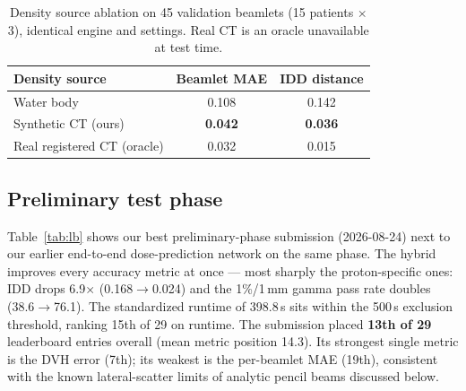 \documentclass[runningheads]{llncs}
\begin{document}
\begin{table}[t]
\centering
\caption{Density source ablation on 45 validation beamlets (15 patients $\times$ 3), identical engine and settings. Real CT is an oracle unavailable at test time.}
\label{tab:density}
\begin{tabular}{lcc}
\toprule
Density source & Beamlet MAE & IDD distance\\
\midrule
Water body & 0.108 & 0.142\\
Synthetic CT (ours) & \textbf{0.042} & \textbf{0.036}\\
Real registered CT (oracle) & 0.032 & 0.015\\
\bottomrule
\end{tabular}
\end{table}

\subsection{Preliminary test phase}
Table~\ref{tab:lb} shows our best preliminary-phase submission (2026-08-24) next to our earlier end-to-end dose-prediction network on the same phase. The hybrid improves every accuracy metric at once --- most sharply the proton-specific ones: IDD drops 6.9$\times$ (0.168$\rightarrow$0.024) and the 1\%/1\,mm gamma pass rate doubles (38.6$\rightarrow$76.1). The standardized runtime of 398.8\,s sits within the 500\,s exclusion threshold, ranking 15th of 29 on runtime. The submission placed \textbf{13th of 29} leaderboard entries overall (mean metric position 14.3). Its strongest single metric is the DVH error (7th); its weakest is the per-beamlet MAE (19th), consistent with the known lateral-scatter limits of analytic pencil beams discussed below.
\end{document}
